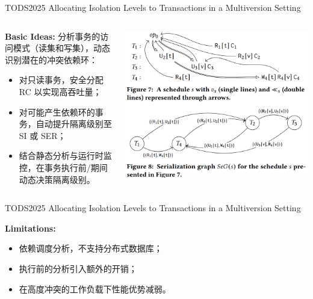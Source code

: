 \begin{frame}{TODS2025 Allocating Isolation Levels to Transactions in a Multiversion Setting}
	\begin{columns}
		\begin{column}{0.5\textwidth}
			\textbf{Basic Ideas: }分析事务的访问模式（读集和写集），动态识别潜在的冲突依赖环：
			\begin{itemize}
				\item 对只读事务，安全分配 RC 以实现高吞吐量；
				\item 对可能产生依赖环的事务，自动提升隔离级别至 SI 或 SER；
				\item 结合静态分析与运行时监控，在事务执行前/期间动态决策隔离级别。
			\end{itemize}
		\end{column}
		\begin{column}{0.5\textwidth}
			\includegraphics[width=0.98\linewidth]{figs/confliction-detect}
		\end{column}
	\end{columns}
\end{frame}

\begin{frame}{TODS2025 Allocating Isolation Levels to Transactions in a Multiversion Setting}

	\textbf{Limitations: }
	\begin{itemize}
		\item 依赖调度分析，不支持分布式数据库；
		\item 执行前的分析引入额外的开销；
		\item 在高度冲突的工作负载下性能优势减弱。
	\end{itemize}

\end{frame}

